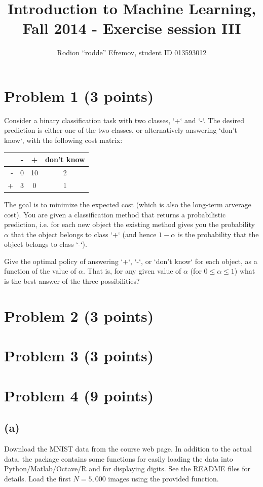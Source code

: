\documentclass[10pt]{article}
\title{Introduction to Machine Learning, Fall 2014 - Exercise session III}
\author{Rodion ``rodde'' Efremov, student ID 013593012}
\begin{document}
 \maketitle

\section*{Problem 1 (3 points)}
\color{blue}
Consider a binary classification task with two classes, `+` and `-`. The desired prediction is either one of the two classes,  or alternatively answering `don't know`, with the following cost matrix:
\color{black}
\begin{center}
\begin{tabular}{r|c|c|c|}
 & - & + & don't know \\
\hline
- & 0 & 10 & 2 \\
\hline
+ & 3 & 0 & 1 \\
\hline
\end{tabular}
\end{center}
\color{blue}
The goal is to minimize the expected cost (which is also the long-term arverage cost). You are given a classification method that returns a probabilistic prediction, i.e. for each new object the existing method gives you the probability $\alpha$ that the object belongs to class `+` (and hence $1 - \alpha$ is the probability that the object belongs to class `-`).

\noindent Give the optimal policy of answering `+`, `-`, or `don't know` for each object, as a function of the value of $\alpha$. That is, for any given value of $\alpha$ (for $0 \leq \alpha \leq 1$) what is the best answer of the three possibilities?
\color{black}
\section*{Problem 2 (3 points)}

\section*{Problem 3 (3 points)}

\section*{Problem 4 (9 points)}
\subsection*{(a)}
\color{blue}
Download the MNIST data from the course web page. In addition to the actual data, the package contains some functions for easily loading the data into Python/Matlab/Octave/R and for displaying digits. See the README files for details. Load the first $N=5,000$ images using the provided function.
\color{black}
\end{document}
